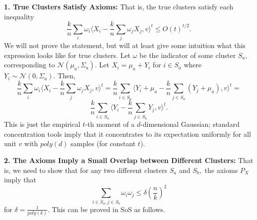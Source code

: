 \documentclass[12pt]{article}%
\newcommand{\normal}{\mathcal{N}}
\begin{document}
\noindent
\textbf{1. True Clusters Satisfy Axioms:} That is, the true clusters satisfy each inequality
$$
\frac{k}{n}
\sum_i \omega_i 
\langle X_i - \frac{k}{n}\sum_j \omega_j X_j, 
v\rangle ^t \le 
O(t)^{t/2}.
$$
We will not prove the statement, but will at least give some intuition what this expression looks like for true clusters. Let $\omega$ be the indicator of some cluster $S_a,$ corresponding to $\normal(\mu_a, \Sigma_a).$ Let $X_i = \mu_a + Y_i$ for $i \in S_a$ where $Y_i \sim \normal(0, \Sigma_a).$ Then, 
$$
\frac{k}{n}
\sum_i \omega_i 
\langle X_i - \frac{k}{n}\sum_j \omega_j X_j, 
v\rangle ^t = 
\frac{k}{n}
\sum_{i \in S_a}
\langle Y_i+\mu_a - \frac{k}{n}\sum_{j \in S_a} (Y_j + \mu_a), 
v\rangle ^t = 
$$
$$
\frac{k}{n}
\sum_{i \in S_a}
\langle Y_i- \frac{k}{n}\sum_{j \in S_a} Y_j, 
v\rangle ^t.
$$
This is just the empirical $t$-th moment of a $d$-dimensional Gaussian; standard concentration tools imply that it concentrates to its expectation uniformly for all unit $v$ with $poly(d)$ samples (for constant $t$).



\noindent
\textbf{2. The Axioms Imply a Small Overlap between Different Clusters:} That is, we need to show that for any two different clusters $S_a$ and $S_b,$ the axioms $P_X$ imply that 
$$
\sum_{i \in S_a, j \in S_b}\omega_i\omega_j\le \delta \left( \frac{n}{k}\right)^2 
$$
for $\delta = \frac{1}{poly(k)}.$ This can be proved in SoS as follows.\\ 
\end{document}

